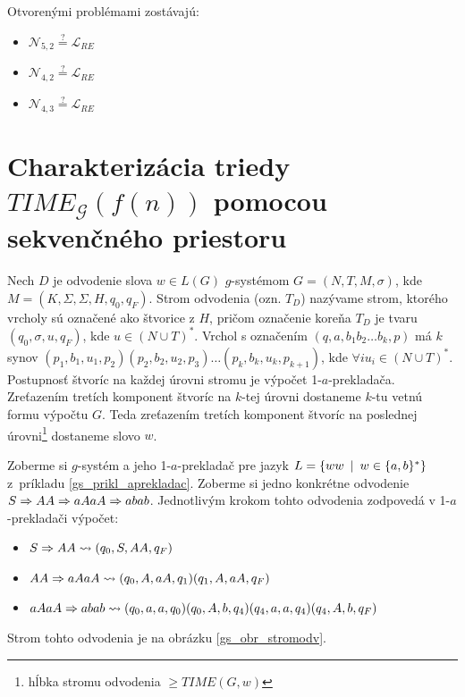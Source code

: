 Otvorenými problémami zostávajú:
\begin{itemize}
  \item $\mathcal{N}_{5,2}\overset{?}{=}\mathcal{L}_{RE}$
  \item $\mathcal{N}_{4,2}\overset{?}{=}\mathcal{L}_{RE}$
  \item $\mathcal{N}_{4,3}\overset{?}{=}\mathcal{L}_{RE}$
\end{itemize}

\section{Charakterizácia triedy $TIME_{\mathcal{G}}(f(n))$ pomocou
sek\-venč\-ného priestoru}

\begin{definicia}
Nech $D$ je odvodenie slova $w\in L(G)$ $g$-systémom
$G=(N,T,M,\sigma)$, kde $M=(K,\Sigma,\Sigma,H,q_0,q_F)$. Strom
odvodenia (ozn. $T_D$) nazývame strom, ktorého vrcholy sú označené
ako štvorice z $H$, pričom označenie koreňa $T_D$ je tvaru
$(q_0,\sigma,u,q_F)$, kde $u\in (N\cup T)^*$. Vrchol s označením
$(q,a,b_1b_2\dots b_k,p)$ má $k$ synov $(p_1,b_1,u_1,p_2)
(p_2,b_2,u_2,p_3)\dots(p_k,b_k,u_k,p_{k+1})$, kde $\forall i
u_i\in (N\cup T)^*$. Postupnosť štvoríc na každej úrovni stromu je
výpočet 1-$a$-prekladača. Zreťazením tretích komponent štvoríc na
$k$-tej úrovni dostaneme $k$-tu vetnú formu výpočtu $G$. Teda
zreťazením tretích komponent štvoríc na poslednej
úrovni\footnote{hĺbka stromu odvodenia $\geq TIME(G,w)$} dostaneme
slovo $w$.
\end{definicia}

\begin{priklad}
Zoberme si $g$-systém a jeho 1-$a$-prekladač pre jazyk $L=\{ww\enspace |\enspace
w\in\{a,b\}^* \}$ \mbox{z príkladu} \ref{gs_prikl_aprekladac}. Zoberme si
jedno konkrétne odvodenie $S\Rightarrow AA\Rightarrow aAaA\Rightarrow abab$. Jednotlivým
krokom tohto odvodenia zodpovedá v 1-$a$-prekladači výpočet:
\begin{itemize}
  \item $S\Rightarrow AA\rightsquigarrow (q_0,S,AA,q_F)$
  \item $AA\Rightarrow aAaA\rightsquigarrow (q_0,A,aA,q_1)(q_1,A,aA,q_F)$
  \item $aAaA\Rightarrow abab\rightsquigarrow
  (q_0,a,a,q_0)(q_0,A,b,q_4)(q_4,a,a,q_4)(q_4,A,b,q_F)$
\end{itemize}
Strom tohto odvodenia je na obrázku \ref{gs_obr_stromodv}.
\end{priklad}

\pagebreak

